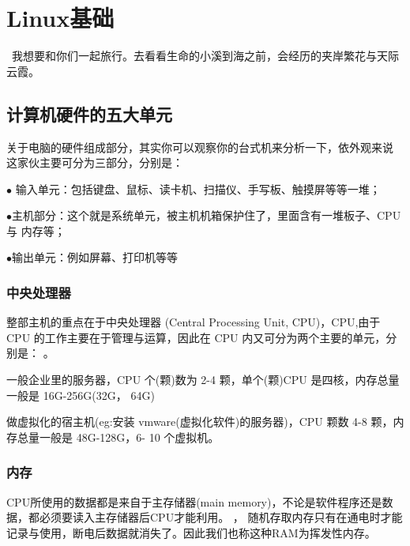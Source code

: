 \chapter{Linux基础}
\begin{center}
	{\textcolor[RGB]{255, 0, 0}{\faHeart}~我想要和你们一起旅行。去看看生命的小溪到海之前，会经历的夹岸繁花与天际云霞。~\textcolor[RGB]{255, 0, 0}{\faHeart}}
	
\end{center}
\section{计算机硬件的五大单元}
关于电脑的硬件组成部分，其实你可以观察你的台式机来分析一下，依外观来说
这家伙主要可分为三部分，分别是：

$\bullet$ 输入单元：包括键盘、鼠标、读卡机、扫描仪、手写板、触摸屏等等一堆；

$\bullet$主机部分：这个就是系统单元，被主机机箱保护住了，里面含有一堆板子、CPU 与
内存等；

$\bullet$输出单元：例如屏幕、打印机等等

\subsection{中央处理器}
整部主机的重点在于中央处理器 (Central Processing Unit, CPU)，CPU,由于 CPU 的工作主要在于管理与运算，因此在 CPU 内又可分为两个主要的单元，分别是： 。

一般企业里的服务器，CPU 个(颗)数为 2-4 颗，单个(颗)CPU 是四核，内存总量一般是 16G-256G(32G， 64G)

做虚拟化的宿主机(eg:安装 vmware(虚拟化软件)的服务器)，CPU 颗数 4-8 颗，内存总量一般是 48G-128G，6- 10 个虚拟机。

\subsection{内存}
CPU所使用的数据都是来自于主存储器(main memory)，不论是软件程序还是数据，都必须要读入主存储器后CPU才能利用。 ， 随机存取内存只有在通电时才能记录与使用，断电后数据就消失了。因此我们也称这种RAM为挥发性内存。




